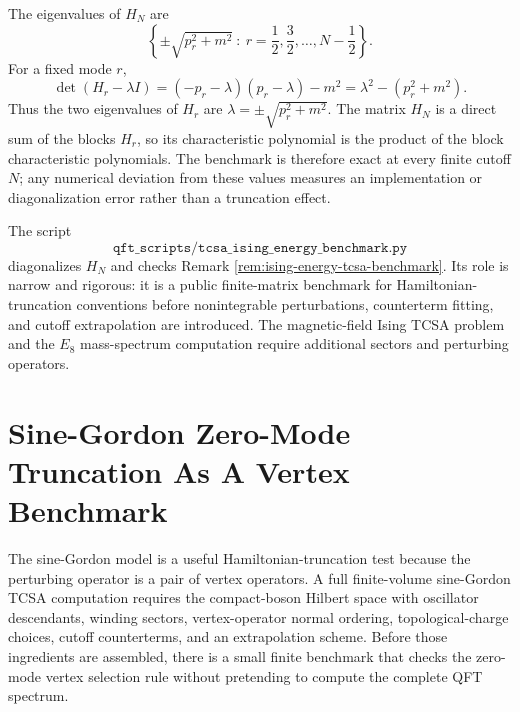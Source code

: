 \begin{remark}
\label{rem:ising-energy-tcsa-benchmark}
The eigenvalues of \(H_N\) are
\[
  \left\{
    \pm\sqrt{p_r^2+m^2}\ :\
    r=\frac12,\frac32,\ldots,N-\frac12
  \right\}.
\]
For a fixed mode \(r\),
\[
  \det(H_r-\lambda I)
  =
  (-p_r-\lambda)(p_r-\lambda)-m^2
  =
  \lambda^2-(p_r^2+m^2).
\]
Thus the two eigenvalues of \(H_r\) are
\(\lambda=\pm\sqrt{p_r^2+m^2}\).  The matrix \(H_N\) is a direct sum of the
blocks \(H_r\), so its characteristic polynomial is the product of the block
characteristic polynomials.  The benchmark is therefore exact at every finite
cutoff \(N\); any numerical deviation from these values measures an
implementation or diagonalization error rather than a truncation effect.
\end{remark}

The script
\[
  \texttt{qft\_scripts/tcsa\_ising\_energy\_benchmark.py}
\]
diagonalizes \(H_N\) and checks Remark
\ref{rem:ising-energy-tcsa-benchmark}.  Its role is narrow and rigorous: it
is a public finite-matrix benchmark for Hamiltonian-truncation conventions
before nonintegrable perturbations, counterterm fitting, and cutoff
extrapolation are introduced.  The magnetic-field Ising TCSA problem and the
\(E_8\) mass-spectrum computation require additional sectors and perturbing
operators.

\section{Sine-Gordon Zero-Mode Truncation As A Vertex Benchmark}
\label{sec:sine-gordon-zero-mode-truncation-benchmark}

The sine-Gordon model is a useful Hamiltonian-truncation test because the
perturbing operator is a pair of vertex operators.  A full finite-volume
sine-Gordon TCSA computation requires the compact-boson Hilbert space with
oscillator descendants, winding sectors, vertex-operator normal ordering,
topological-charge choices, cutoff counterterms, and an extrapolation
scheme.  Before those ingredients are assembled, there is a small finite
benchmark that checks the zero-mode vertex selection rule without pretending
to compute the complete QFT spectrum.

